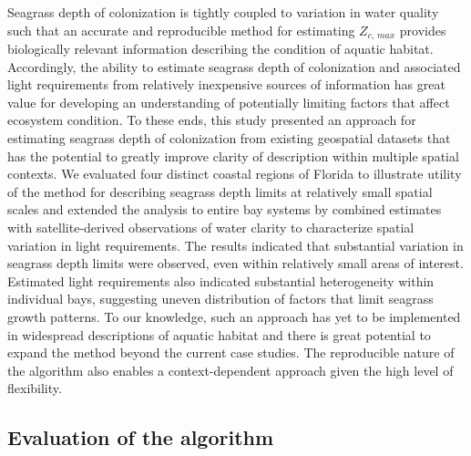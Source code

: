 \documentclass[letterpaper,12pt,oneside]{article}\usepackage[]{graphicx}\usepackage[]{color}
\begin{document}
Seagrass depth of colonization is tightly coupled to variation in water quality such that an accurate and reproducible method for estimating $Z_{c,\,max}$ provides biologically relevant information describing the condition of aquatic habitat.  Accordingly, the ability to estimate seagrass depth of colonization and associated light requirements from relatively inexpensive sources of information has great value for developing an understanding of potentially limiting factors that affect ecosystem condition.  To these ends, this study presented an approach for estimating seagrass depth of colonization from existing geospatial datasets that has the potential to greatly improve clarity of description within multiple spatial contexts.  We evaluated four distinct coastal regions of Florida to illustrate utility of the method for describing seagrass depth limits at relatively small spatial scales and extended the analysis to entire bay systems by combined estimates with satellite-derived observations of water clarity to characterize spatial variation in light requirements.  The results indicated that substantial variation in seagrass depth limits were observed, even within relatively small areas of interest.  Estimated light requirements also indicated substantial heterogeneity within individual bays, suggesting uneven distribution of factors that limit seagrass growth patterns.  To our knowledge, such an approach has yet to be implemented in widespread descriptions of aquatic habitat and there is great potential to expand the method beyond the current case studies.  The reproducible nature of the algorithm also enables a context-dependent approach given the high level of flexibility.

\subsection{Evaluation of the algorithm}
\end{document}
